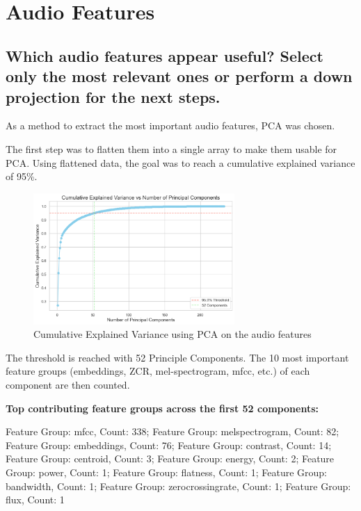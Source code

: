 
\section{Audio Features}
\label{sec:Audio Features}

\subsection{Which audio features appear useful? Select only the most relevant ones or perform a down projection for the next steps.}
\label{sec:Audio Features:a}

As a method to extract the most important audio features, PCA was chosen.

The first step was to flatten them into a single array to make them usable for PCA. Using flattened data, the goal was to reach a cumulative explained variance of 95\%.

\pagebreak

\begin{figure}[htbp]
    \centering
    \includegraphics[width=0.5\linewidth, height=5cm]{figs/Cumulative Explained Variance.png}
    \caption{Cumulative Explained Variance using PCA on the audio features}
    \label{fig:Cumulative Explained Variance}
\end{figure}

The threshold is reached with 52 Principle Components.  The 10 most important feature groups (embeddings, ZCR, mel-spectrogram, mfcc, etc.) of each component are then counted. 

\textbf{Top contributing feature groups across the first 52 components:}

Feature Group: mfcc, Count: 338;
Feature Group: melspectrogram, Count: 82;
Feature Group: embeddings, Count: 76;
Feature Group: contrast, Count: 14;
Feature Group: centroid, Count: 3;
Feature Group: energy, Count: 2;
Feature Group: power, Count: 1;
Feature Group: flatness, Count: 1;
Feature Group: bandwidth, Count: 1;
Feature Group: zerocrossingrate, Count: 1;
Feature Group: flux, Count: 1

